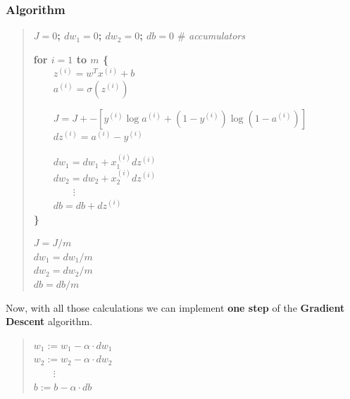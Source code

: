 \documentclass[
]{book}
\begin{document}
\hypertarget{algorithm}{%
\subsubsection{Algorithm}\label{algorithm}}

\begin{quote}
\textbf{\(J=0\); \(dw_1=0\); \(dw_2=0\); \(db=0\)} \# \emph{accumulators}

\textbf{for \(i=1\) to \(m\) \{}\\
\textbf{  \(z^{(i)} = w^Tx^{(i)} + b\)}\\
\textbf{  \(a^{(i)} = \sigma (z^{(i)})\)}

\textbf{  \(J = J + -[y^{(i)}\log a^{(i)} + (1-y^{(i)})\log (1-a^{(i)})]\)}\\
\textbf{  \(dz^{(i)} = a^{(i)} - y^{(i)}\)}

\textbf{  \(dw_1 = dw_1 + x^{(i)}_1 dz^{(i)}\)}\\
\textbf{  \(dw_2 = dw_2 + x^{(i)}_2 dz^{(i)}\)}\\
\textbf{    \(\vdots\)}\\
\textbf{  \(db = db + dz^{(i)}\)}\\
\textbf{\}}

\textbf{\(J = J / m\)}\\
\textbf{\(dw_1 = dw_1 / m\)}\\
\textbf{\(dw_2 = dw_2 / m\)}\\
\textbf{\(db = db / m\)}
\end{quote}

Now, with all those calculations we can implement \textbf{one step} of the \textbf{Gradient Descent} algorithm.

\begin{quote}
\(w_1 := w_1 - \alpha \cdot dw_1\)\\
\(w_2 := w_2 - \alpha \cdot dw_2\)\\
  \(\vdots\)\\
\(b := b - \alpha \cdot db\)
\end{quote}

  
\end{document}
